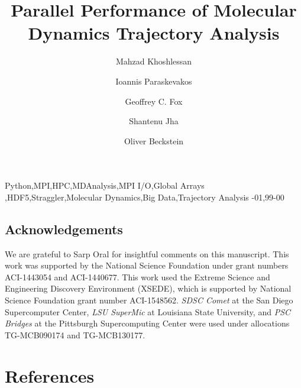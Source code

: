 \documentclass[1p,sort&compress,times]{elsarticle}
\begin{document}
\begin{frontmatter}    

\title{Parallel Performance of Molecular Dynamics Trajectory Analysis}

\author[ASUphysics]{Mahzad Khoshlessan}

\author[Rutgers]{Ioannis Paraskevakos}

\author[IndianaDSC]{Geoffrey C. Fox}

\author[Rutgers]{Shantenu Jha}

\author[ASUphysics,ASUCBP]{Oliver Beckstein}

\address[ASUphysics]{Department of Physics, Arizona State University,
  Tempe, AZ 85281, USA}
\address[Rutgers]{Department of Electrical \& Computer Engineering,
  Rutgers University, Piscataway, NJ 08854, USA}
\address[IndianaDSC]{Digital Science Center, Indiana University,
  Bloomington, IN 47405}
\address[ASUCBP]{Center for Biological Physics, Arizona State University,
  Tempe, AZ 85281, USA}

    


\begin{keyword}
Python\sep MPI\sep HPC\sep MDAnalysis\sep MPI I/O\sep Global Arrays \sep HDF5\sep Straggler\sep Molecular Dynamics\sep Big Data\sep Trajectory Analysis
-01\sep  99-00
\end{keyword}

\end{frontmatter}












\subsection*{Acknowledgements}
\label{acknowledgements}


We are grateful to Sarp Oral for insightful comments on this manuscript.
This work was supported by the National Science Foundation under grant numbers ACI-1443054 and ACI-1440677.
This work used the Extreme Science and Engineering Discovery Environment (XSEDE), which is supported by National Science Foundation grant number ACI-1548562.
\emph{SDSC Comet} at the San Diego Supercomputer Center, \emph{LSU SuperMic} at Louisiana State University, and \emph{PSC Bridges} at the Pittsburgh Supercomputing Center were used under allocations TG-MCB090174 and TG-MCB130177.

\section*{References}



\clearpage

\appendix



\end{document}
